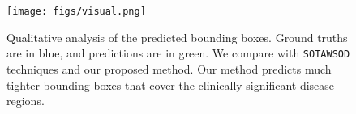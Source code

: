 \documentclass[runningheads]{llncs}
\def\sota{\texttt{SOTA}\xspace}
\def\wsod{\texttt{WSOD}\xspace}
\def\mil{\texttt{MIL}\xspace}
\def\detr{\texttt{DETR}\xspace}
\begin{document}
%
\begin{figure}[t]
    \centering
    \texttt{[image: figs/visual.png]}
    \caption{Qualitative analysis of the predicted bounding boxes. Ground truths are in blue, and predictions are in green. We compare with \sota \wsod techniques and our proposed method. Our method predicts much tighter bounding boxes that cover the clinically significant disease regions.}
    \label{fig:visuals}
\end{figure}
%
\begin{table}[t]
	\centering
	\setlength{\tabcolsep}{6pt}
	\caption{Ablation study. Performance of \mil-framework variants on \detr. We compare the AP and detection sensitivity.} 
	\label{tab:ablation}
\end{table}
\end{document}

